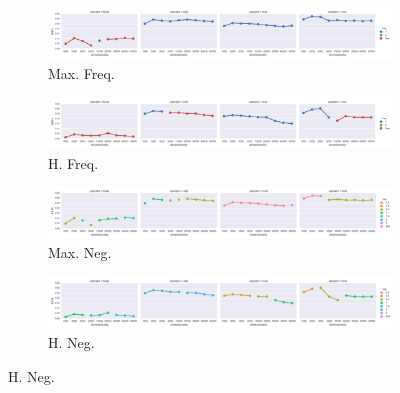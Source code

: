 


\begin{landscape}

\begin{figure}
  \centering

  \begin{subfigure}[t]{0.7\textwidth}
    \includegraphics[width=\textwidth]{supplement/figures/KS14-max_-selection-freq}
    \caption{Max. Freq.}
    \label{fig:}
  \end{subfigure}
  \begin{subfigure}[t]{0.7\textwidth}
    \includegraphics[width=\textwidth]{supplement/figures/KS14-heuristics-selection-freq}
    \caption{H. Freq.}
    \label{fig:}
  \end{subfigure}

  \begin{subfigure}[t]{0.7\textwidth}
    \includegraphics[width=\textwidth]{supplement/figures/KS14-max_-selection-neg}
    \caption{Max. Neg.}
    \label{fig:}
  \end{subfigure}
  \begin{subfigure}[t]{0.7\textwidth}
    \includegraphics[width=\textwidth]{supplement/figures/KS14-heuristics-selection-neg}
    \caption{H. Neg.}
    \label{fig:}
  \end{subfigure}


\end{figure}
\end{landscape}
